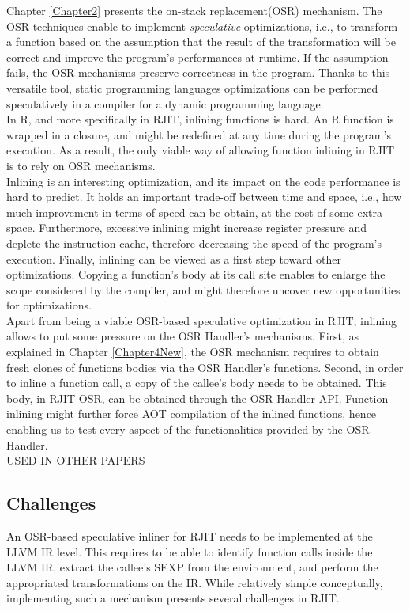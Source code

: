 Chapter \ref{Chapter2} presents the on-stack replacement(OSR) mechanism.
The OSR techniques enable to implement \textit{speculative} optimizations, i.e., to transform a function based on the assumption that the result of the transformation will be correct and improve the program's performances at runtime.
If the assumption fails, the OSR mechanisms preserve correctness in the program.
Thanks to this versatile tool, static programming languages optimizations can be performed speculatively in a compiler for a dynamic programming language.\\

In R, and more specifically in RJIT, inlining functions is hard. 
An R function is wrapped in a closure, and might be redefined at any time during the program's execution.
As a result, the only viable way of allowing function inlining in RJIT is to rely on OSR mechanisms.\\

Inlining is an interesting optimization, and its impact on the code performance is hard to predict. 
It holds an important trade-off between time and space, i.e., how much improvement in terms of speed can be obtain, at the cost of some extra space.
Furthermore, excessive inlining might increase register pressure and deplete the instruction cache, therefore decreasing the speed of the program's execution.
Finally, inlining can be viewed as a first step toward other optimizations.
Copying a function's body at its call site enables to enlarge the scope considered by the compiler, and might therefore uncover new opportunities for optimizations.\\

Apart from being a viable OSR-based speculative optimization in RJIT, inlining allows to put some pressure on the OSR Handler's mechanisms.
First, as explained in Chapter \ref{Chapter4New}, the OSR mechanism requires to obtain fresh clones of functions bodies via the OSR Handler's functions.
Second, in order to inline a function call, a copy of the callee's body needs to be obtained.
This body, in RJIT OSR, can be obtained through the OSR Handler API.
Function inlining might further force AOT compilation of the inlined functions, hence enabling us to test every aspect of the functionalities provided by the OSR Handler.\\

USED IN OTHER PAPERS\\


\subsection{Challenges}
An OSR-based speculative inliner for RJIT needs to be implemented at the LLVM IR level.
This requires to be able to identify function calls inside the LLVM IR, extract the callee's SEXP from the environment, and perform the appropriated transformations on the IR.
While relatively simple conceptually, implementing such a mechanism presents several challenges in RJIT.\\

